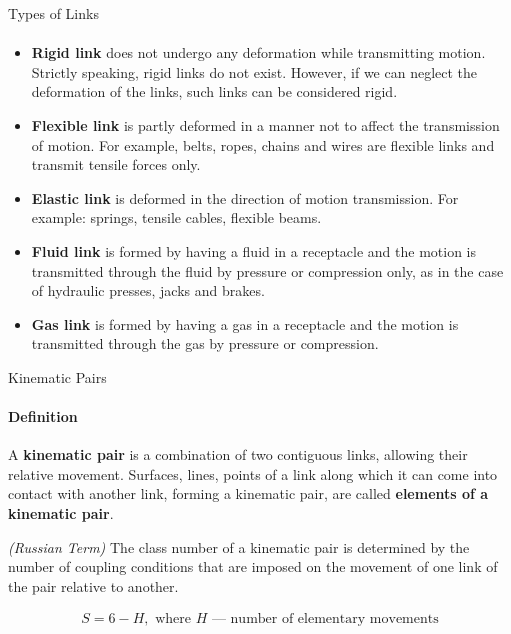 \documentclass[aspectratio=169]{beamer}
\begin{document}
\begin{frame}[t]{Types of Links}
    \framesubtitle{}
    \small
    \vspace{-0.4cm}
    \begin{itemize}
        \item \textbf{Rigid link} does not undergo any deformation while transmitting motion. Strictly speaking, rigid links do not exist. However, if we can neglect the deformation of the links, such links can be considered rigid.
        \item \textbf{Flexible link} is partly deformed in a manner not to affect the transmission of motion. For example, belts, ropes, chains and wires are flexible links and transmit tensile forces only.
        \item \textbf{Elastic link} is deformed in the direction of motion transmission. For example: springs, tensile cables, flexible beams.
        \item \textbf{Fluid link} is formed by having a fluid in a receptacle and the motion is transmitted through the fluid by pressure or compression only, as in the case of hydraulic presses, jacks and brakes.
        \item \textbf{Gas link} is formed by having a gas in a receptacle and the motion is transmitted through the gas by pressure or compression.
    \end{itemize}
\end{frame}

\begin{frame}[t]{Kinematic Pairs}
    \framesubtitle{Definition}
    A \textbf{kinematic pair} is a combination of two contiguous links, allowing their relative movement. Surfaces, lines, points of a link along which it can come into contact with another link, forming a kinematic pair, are called \textbf{elements of a kinematic pair}.
    \medskip

    \textit{(Russian Term)} The class number of a kinematic pair is determined by the number of coupling conditions that are imposed on the movement of one link of the pair relative to another.

    \begin{align*}
        S = 6 - H, \text{ where $H$ --- number of elementary movements}
    \end{align*}
\end{frame}
\end{document}
